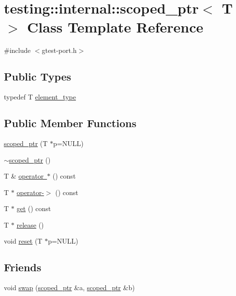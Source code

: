 \hypertarget{classtesting_1_1internal_1_1scoped__ptr}{}\section{testing\+::internal\+::scoped\+\_\+ptr$<$ T $>$ Class Template Reference}
\label{classtesting_1_1internal_1_1scoped__ptr}


{\ttfamily \#include $<$gtest-\/port.\+h$>$}

\subsection*{Public Types}
\begin{DoxyCompactItemize}
\item 
typedef T \mbox{\hyperlink{classtesting_1_1internal_1_1scoped__ptr_ae755ffeebada8e20b68c1d1ffa91cf13}{element\+\_\+type}}
\end{DoxyCompactItemize}
\subsection*{Public Member Functions}
\begin{DoxyCompactItemize}
\item 
\mbox{\hyperlink{classtesting_1_1internal_1_1scoped__ptr_adb972432999a0c63720df148964ac2a5}{scoped\+\_\+ptr}} (T $\ast$p=N\+U\+LL)
\item 
\mbox{\hyperlink{classtesting_1_1internal_1_1scoped__ptr_ab721de9bf4369f002fb563e82352ee36}{$\sim$scoped\+\_\+ptr}} ()
\item 
T \& \mbox{\hyperlink{classtesting_1_1internal_1_1scoped__ptr_a50072151dae2c3d7658413093edf567c}{operator $\ast$}} () const
\item 
T $\ast$ \mbox{\hyperlink{classtesting_1_1internal_1_1scoped__ptr_a2b465830a322e2c3ea420e5ccf0472f4}{operator-\/$>$}} () const
\item 
T $\ast$ \mbox{\hyperlink{classtesting_1_1internal_1_1scoped__ptr_aa5984291e12453f1e81b7676d1fa26fd}{get}} () const
\item 
T $\ast$ \mbox{\hyperlink{classtesting_1_1internal_1_1scoped__ptr_a7a4f3e568d81a5d8bcb5f8d6bf5130b1}{release}} ()
\item 
void \mbox{\hyperlink{classtesting_1_1internal_1_1scoped__ptr_acac03266a43359801aff0de5c990bec0}{reset}} (T $\ast$p=N\+U\+LL)
\end{DoxyCompactItemize}
\subsection*{Friends}
\begin{DoxyCompactItemize}
\item 
void \mbox{\hyperlink{classtesting_1_1internal_1_1scoped__ptr_a01bc0441e6a3ebf26807ac523392ca86}{swap}} (\mbox{\hyperlink{classtesting_1_1internal_1_1scoped__ptr}{scoped\+\_\+ptr}} \&a, \mbox{\hyperlink{classtesting_1_1internal_1_1scoped__ptr}{scoped\+\_\+ptr}} \&b)
\end{DoxyCompactItemize}



